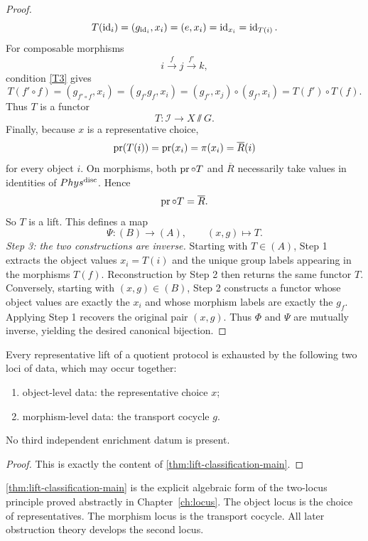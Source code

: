 \begin{proof}
	\[
		T(\operatorname{id}_i)=(g_{\operatorname{id}_i},x_i)=(e,x_i)=\operatorname{id}_{x_i}=\operatorname{id}_{T(i)}.
	\]
	For composable morphisms
	\[
		i\xrightarrow{f}j\xrightarrow{f'}k,
	\]
	condition \textup{\ref{T3}} gives
	\[
		T(f'\circ f)
		=
		(g_{f'\circ f},x_i)
		=
		(g_{f'}g_f,x_i)
		=
		(g_{f'},x_j)\circ(g_f,x_i)
		=
		T(f')\circ T(f).
	\]
	Thus \(T\) is a functor
	\[
		T:\mathcal I\to X\sslash G.
	\]
	Finally, because \(x\) is a representative choice,
	\[
		\operatorname{pr}(T(i))=\operatorname{pr}(x_i)=\pi(x_i)=\overline R(i)
	\]
	for every object \(i\).
	On morphisms, both \(\operatorname{pr}\circ T\) and \(\overline R\) necessarily take
	values in identities of \(Phys^{\mathrm{disc}}\).
	Hence
	\[
		\operatorname{pr}\circ T=\overline R.
	\]
	So \(T\) is a lift.
	This defines a map
	\[
		\Psi:(B)\to(A),
		\qquad
		(x,g)\mapsto T.
	\]
	\smallskip
	\noindent
	\emph{Step 3: the two constructions are inverse.}
	Starting with \(T\in(A)\), Step 1 extracts the object values
	\(x_i=T(i)\) and the unique group labels appearing in the morphisms
	\(T(f)\).
	Reconstruction by Step 2 then returns the same functor \(T\).
	Conversely, starting with \((x,g)\in(B)\), Step 2 constructs a functor
	whose object values are exactly the \(x_i\) and whose morphism labels
	are exactly the \(g_f\).
	Applying Step 1 recovers the original pair \((x,g)\).
	Thus \(\Phi\) and \(\Psi\) are mutually inverse, yielding the desired
	canonical bijection.
\end{proof}
\begin{corollary}
	\label{cor:two-loci-lift}
	Every representative lift of a quotient protocol is exhausted by the
	following two loci of data, which may occur together:
	\begin{enumerate}[label=\textup{(\roman*)}]
		\item object-level data: the representative choice \(x\);
		\item morphism-level data: the transport cocycle \(g\).
	\end{enumerate}
	No third independent enrichment datum is present.
\end{corollary}
\begin{proof}
	This is exactly the content of
	\cref{thm:lift-classification-main}.
\end{proof}
\begin{remark}
	\cref{thm:lift-classification-main} is the explicit algebraic form of
	the two-locus principle proved abstractly in Chapter~\ref{ch:locus}.
	The object locus is the choice of representatives.
	The morphism locus is the transport cocycle.
	All later obstruction theory develops the second locus.
\end{remark}
